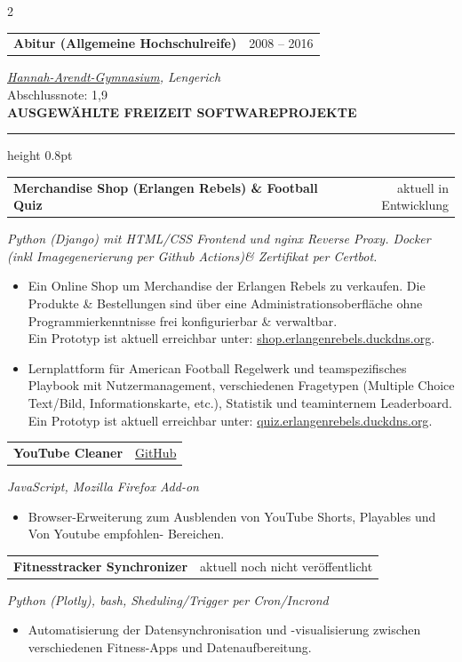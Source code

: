 \documentclass[10pt,a4paper]{article}
\makeatletter
\newcommand{\mainheading}[1]{%
  \vspace{12pt}%
  {\large\bfseries\color{accent}\MakeUppercase{#1}}\par
  \vspace{2pt}%
  {\color{accent}\hrule height 0.8pt}%
  \vspace{8pt}%
}
\newcommand{\cventry}[2]{%
  \begin{tabularx}{\linewidth}{@{}X@{\hspace{10pt}}r@{}}
    \textbf{#1} & {\small\color{textmuted}#2} \\
  \end{tabularx}\par\vspace{1pt}%
}
\makeatother
\begin{document}
\begin{paracol}{2}
\begin{rightcolumn}
\cventry{Abitur (Allgemeine Hochschulreife)}{2008 -- 2016}
{\small\textit{\href{https://www.hag-lengerich.de/}{Hannah-Arendt-Gymnasium}, Lengerich}}\\
{\small Abschlussnote: 1,9}\\

\mainheading{Ausgewählte Freizeit Softwareprojekte}

\cventry{Merchandise Shop (Erlangen Rebels) \& Football Quiz}{aktuell in Entwicklung}
{\small\textit{Python (Django) mit HTML/CSS Frontend und nginx Reverse Proxy. Docker (inkl Imagegenerierung per Github Actions)\& Zertifikat per Certbot.}}
\begin{itemize}
  \item Ein Online Shop um Merchandise der Erlangen Rebels zu verkaufen. Die Produkte \& Bestellungen sind über eine Administrationsoberfläche ohne Programmierkenntnisse frei konfigurierbar \& verwaltbar.
  \vspace{3pt}\\
  Ein Prototyp ist aktuell erreichbar unter: \href{https://shop.erlangenrebels.duckdns.org/}{shop.erlangenrebels.duckdns.org}.
  \item Lernplattform für American Football Regelwerk und teamspezifisches Playbook mit Nutzermanagement, 
  verschiedenen Fragetypen (Multiple Choice Text/Bild, Informationskarte, etc.), Statistik und teaminternem Leaderboard.
  \vspace{3pt}\\
  Ein Prototyp ist aktuell erreichbar unter: \href{https://quiz.erlangenrebels.duckdns.org/}{quiz.erlangenrebels.duckdns.org}.
\end{itemize}
\vspace{8pt}


\cventry{YouTube Cleaner}{\href{https://github.com/Quinn1224/Youtube-Cleaner}{GitHub}}
{\small\textit{JavaScript, Mozilla Firefox Add-on}}
\begin{itemize}
  \item Browser-Erweiterung zum Ausblenden von YouTube Shorts, Playables und \textquotedbl Von Youtube empfohlen\textquotedbl - Bereichen.
\end{itemize}
\vspace{8pt}

\cventry{Fitnesstracker Synchronizer}{aktuell noch nicht veröffentlicht}
{\small\textit{Python (Plotly), bash, Sheduling/Trigger per Cron/Incrond}}
\begin{itemize}
  \item Automatisierung der Datensynchronisation und -visualisierung zwischen verschiedenen Fitness-Apps und Datenaufbereitung.
\end{itemize}


\end{rightcolumn}
\end{paracol}
\end{document}
